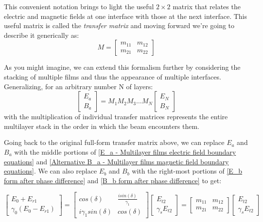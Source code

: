 This convenient notation brings to light the useful $2 \times 2$ matrix that relates the electric and magnetic fields at one interface with those at the next interface. This useful matrix is called the \emph{transfer matrix} and moving forward we're going to describe it generically as:
\[
M=
  \begin{bmatrix}
    m_{11} & m_{12}  \\
    m_{21} & m_{22}
  \end{bmatrix}
\]

As you might imagine, we can extend this formalism further by considering the stacking of multiple films and thus the appearance of multiple interfaces. Generalizing, for an arbitrary number N of layers:
\[
  \begin{bmatrix}
    E_a  \\
    B_a
  \end{bmatrix} = 
    M_1M_2M_3\hdots M_N
    \begin{bmatrix}
    E_N \\
    B_N
  \end{bmatrix}
\]
with the multiplication of individual transfer matrices represents the entire multilayer stack in the order in which the beam encounters them.

Going back to the original full-form transfer matrix above, we can replace $E_a$ and $B_a$ with the middle portions of \ref{E_a - Multilayer films electric field boundary equations} and \ref{Alternative B_a - Multilayer films magnetic field boundary equations}. We can also replace $E_b$ and $B_b$ with the right-most portions of \ref{E_b form after phase difference} and \ref{B_b form after phase difference} to get:

\[
  \begin{bmatrix}
    E_0 + E_{r1}  \\
    \gamma_0(E_0 - E_{r1})
  \end{bmatrix} = 
    \begin{bmatrix}
    cos(\delta) & \frac{isin(\delta)}{\gamma_1}    \\
    i\gamma_1sin(\delta) & cos(\delta)
    \end{bmatrix}
    \begin{bmatrix}
    E_{t2}  \\
    \gamma_sE_{t2}
  \end{bmatrix} =
        \begin{bmatrix}
            m_{11} & m_{12}  \\
            m_{21} & m_{22}
        \end{bmatrix}
        \begin{bmatrix}
            E_{t2}  \\
            \gamma_sE_{t2}
          \end{bmatrix}
\]

